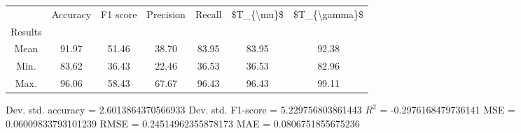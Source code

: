 \begin{tabular}{|c|c|c|c|c|c|c|}
\toprule
{} &  Accuracy &  F1 score &  Precision &  Recall &  \$T\_\{\textbackslash mu\}\$ &  \$T\_\{\textbackslash gamma\}\$ \\
Results &           &           &            &         &            &               \\
\hline
Mean    &     91.97 &     51.46 &      38.70 &   83.95 &      83.95 &         92.38 \\
Min.    &     83.62 &     36.43 &      22.46 &   36.53 &      36.53 &         82.96 \\
Max.    &     96.06 &     58.43 &      67.67 &   96.43 &      96.43 &         99.11 \\
\bottomrule
\end{tabular}

 Dev. std. accuracy = 2.6013864370566933
 Dev. std. F1-score = 5.229756803861443
 $R^2$ = -0.2976168479736141
 MSE = 0.06009833793101239
 RMSE = 0.24514962355878173
 MAE = 0.0806751855675236